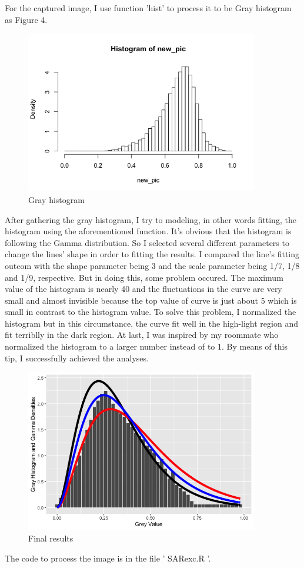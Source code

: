 \documentclass{article}
\begin{document}
	\par For the captured image, I use function 'hist'  to process it to be Gray histogram as Figure 4.
	
	\begin{figure}[h] %
		\centering
		\includegraphics[width=4in]{picture/hist.png} %
		\caption{Gray histogram}
	\end{figure}
	
    \par After gathering the gray histogram, I try to modeling, in other words fitting, the histogram using the aforementioned function. It's obvious that the histogram is following the Gamma distribution. So I selected several different parameters to change the lines' shape in order to fitting the results. I compared the line's fitting outcom with the shape parameter being 3 and the scale parameter being 1/7, 1/8 and 1/9, respective. But in doing this, some problem occured. The maximum value of the histogram is nearly 40 and the fluctuations in the curve are very small and almost invisible because the top value of curve is just about 5 which is small in contrast to the histogram value. To solve this problem, I normalized the histogram but in this circumstance, the curve fit well in the high-light region and fit terriblly in the dark region. At last, I was inspired by my roommate who normalized the histogram to a larger number instead of to 1. By means of this tip, I successfully achieved the analyses. 
    
    \begin{figure}[h] %
    	\centering
    	\includegraphics[width=4in]{picture/Rplot.png} %
    	\caption{ Final results}
    \end{figure}

    \begin{warn}[Codes:]
    	The code to process the image is in the file ' SARexc.R '.
    \end{warn}
\end{document}
